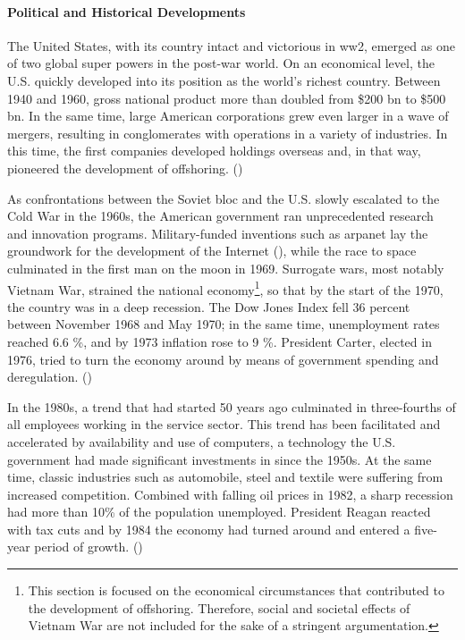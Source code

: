 \paragraph{Political and Historical Developments} \label{par:USHistory}
The United States, with its country intact and victorious in \gls{ww2}, emerged as one of two global super powers in the post-war world. On an economical level, the U.S. quickly developed into its position as the world's richest country. Between 1940 and 1960, gross national product more than doubled from \$200 \nolinebreak bn to \$500 \nolinebreak bn. In the same time, large American corporations grew even larger in a wave of mergers, resulting in conglomerates with operations in a variety of industries. In this time, the first companies developed holdings overseas and, in that way, pioneered the development of offshoring. (\cite{Winkler.1994b})

As confrontations between the Soviet bloc and the U.S. slowly escalated to the Cold War in the 1960s, the American government ran unprecedented research and innovation programs. Military-funded inventions such as \acrshort{arpanet} lay the groundwork for the development of the Internet (\cite{Leiner.2003}), while the race to space culminated in the first man on the moon in 1969. Surrogate wars, most notably Vietnam War, strained the national economy\footnote{This section is focused on the economical circumstances that contributed to the development of offshoring. Therefore, social and societal effects of Vietnam War are not included for the sake of a stringent argumentation.}, so that by the start of the 1970, the country was in a deep recession. The Dow Jones Index fell 36 percent between November 1968 and May 1970; in the same time, unemployment rates reached 6.6 \%, and by 1973 inflation rose to 9 \%. President Carter, elected in 1976, tried to turn the economy around by means of government spending and deregulation.
(\cite{Winkler.1994})


In the 1980s, a trend that had started 50 years ago culminated in three-fourths of all employees working in the service sector. This trend has been facilitated and accelerated by availability and use of computers, a technology the U.S. government had made significant investments in since the 1950s. At the same time, classic industries such as automobile, steel and textile were suffering from increased competition. Combined with falling oil prices in 1982, a sharp recession had more than 10\% of the population unemployed. President Reagan reacted with tax cuts and by 1984 the economy had turned around and entered a five-year period of growth.
(\cite{Winkler.1994c})

